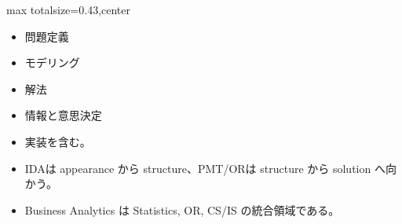 \clearpage
{}
\begin{minipage}[t]{0.405\textwidth}
\begin{adjustbox}{max totalsize={\textwidth}{0.43\textheight},center}
\begin{minipage}{\textwidth}\scriptsize
{}\begin{itemize}
\item 問題定義
\item モデリング
\item 解法
\item 情報と意思決定
\item 実装を含む。
\end{itemize}\begin{itemize}
\item IDAは appearance から structure、PMT/ORは structure から solution へ向かう。
\item Business Analytics は Statistics, OR, CS/IS の統合領域である。
\end{itemize}
\end{minipage}
\end{adjustbox}
\end{minipage}\hfill
